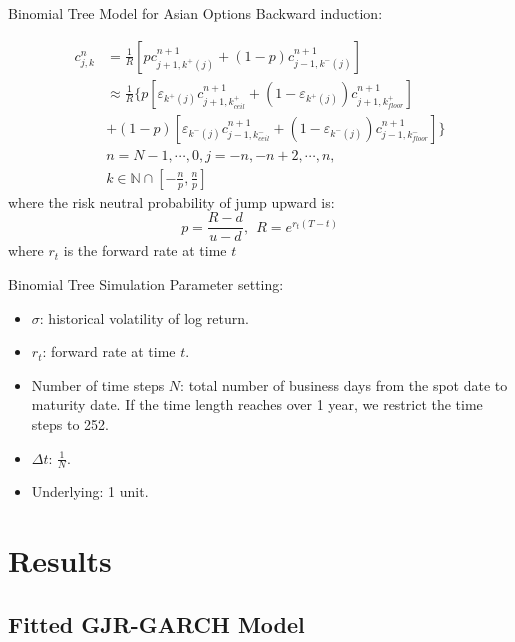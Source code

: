\documentclass[8pt]{beamer}
\numberwithin{equation}{section}
\begin{document}
\begin{frame}{Binomial Tree Model for Asian Options}
Backward induction:

\begin{equation}\label{arith: back induction}
\begin{split}
c^n_{j, k} &= \frac{1}{R} \left[ p c^{n + 1}_{j + 1, k^+(j)} + (1 - p) c^{n + 1}_{j - 1, k^-(j)}\right] \\
&\approx \frac{1}{R} \{ p \left[ \varepsilon_{k^+(j)} c^{n + 1}_{j + 1, k^+_{ceil}} + (1 - \varepsilon_{k^+(j)}) c^{n + 1}_{j + 1, k^+_{floor}} \right] \\
&+ (1 - p) \left[ \varepsilon_{k^-(j)} c^{n + 1}_{j - 1, k^-_{ceil}} + (1 - \varepsilon_{k^-(j)}) c^{n + 1}_{j - 1, k^-_{floor}} \right]\} \\
&n = N - 1, \cdots, 0, j = -n, -n + 2, \cdots, n, \\
&k \in \mathbb{N} \cap [-\frac{n}{p}, \frac{n}{p}]
\end{split} 
\end{equation}
where the risk neutral probability of jump upward is:
\begin{equation}
p=\frac{R-d}{u-d}, \ \ R = e^{r_t (T - t)}
\end{equation}
where $ r_t $ is the forward rate at time $ t $
\end{frame}

\begin{frame}{Binomial Tree Simulation}
Parameter setting:
\begin{itemize}
\item $ \sigma $: historical volatility of log return.
\item $ r_t $: forward rate at time $ t $.
\item Number of time steps $ N $:  total number of business days from the spot date to maturity date. If the time length reaches over 1 year, we restrict the time steps to 252.
\item $ \Delta t $: $ \frac{1}{N} $.
\item Underlying: 1 unit.
\end{itemize}
\end{frame}

\section{Results}

\frame{\tableofcontents[currentsection]}

\subsection{Fitted GJR-GARCH Model}
\end{document}

